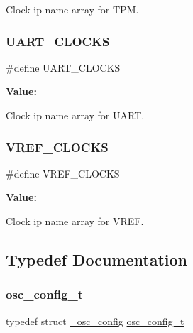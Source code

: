 Clock ip name array for T\+PM. 

\mbox{\label{group__clock_gae6c5e4d33e80e2bc367249c46377ee95}} 
\subsubsection{\texorpdfstring{UART\_CLOCKS}{UART\_CLOCKS}}
{\footnotesize\ttfamily \#define U\+A\+R\+T\+\_\+\+C\+L\+O\+C\+KS}

{\bfseries Value\+:}
\begin{DoxyCode}{0}
\DoxyCodeLine{\{                                                    \(\backslash\)}
\DoxyCodeLine{    \}}

\end{DoxyCode}


Clock ip name array for U\+A\+RT. 

\mbox{\label{group__clock_gadada275d718274d382e3488eebb46d04}} 
\subsubsection{\texorpdfstring{VREF\_CLOCKS}{VREF\_CLOCKS}}
{\footnotesize\ttfamily \#define V\+R\+E\+F\+\_\+\+C\+L\+O\+C\+KS}

{\bfseries Value\+:}
\begin{DoxyCode}{0}
\DoxyCodeLine{\{                \(\backslash\)}
\DoxyCodeLine{    \}}

\end{DoxyCode}


Clock ip name array for V\+R\+EF. 



\subsection{Typedef Documentation}
\mbox{\label{group__clock_ga7b42afca82c7234da7c1ccd5fc4d984b}} 
\subsubsection{\texorpdfstring{osc\_config\_t}{osc\_config\_t}}
{\footnotesize\ttfamily typedef struct \mbox{\hyperlink{struct__osc__config}{\+\_\+osc\+\_\+config}}  \mbox{\hyperlink{group__clock_ga7b42afca82c7234da7c1ccd5fc4d984b}{osc\+\_\+config\+\_\+t}}}



